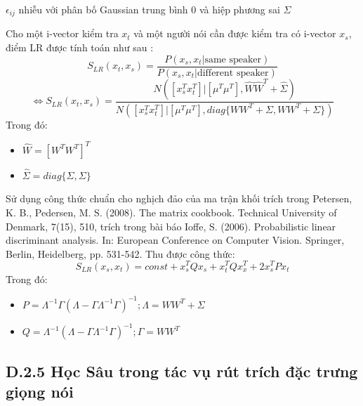 \documentclass{article}
\begin{document}
	$\epsilon_{ij}$ nhiễu với phân bố Gaussian trung bình 0 và hiệp phương sai $\Sigma$
	
	Cho một i-vector kiểm tra $x_t$ và một người nói cần được kiểm tra có i-vector $x_s$, điểm LR được tính toán như sau :
	$$S_{LR}(x_t, x_s) = \frac{P(x_s, x_t|\text{same speaker})}{P(x_s, x_t|\text{different speaker})}$$
	$$\Leftrightarrow S_{LR}(x_t, x_s) = 
	\frac{N([x_s^Tx_t^T]|[\mu^T\mu^T], \hat{W}\hat{W}^T + \hat{\Sigma})}{N([x_s^Tx_t^T]|[\mu^T\mu^T],diag\{WW^T+\Sigma, WW^T+\Sigma\})}$$
	Trong đó:
	\begin{itemize}
		\item $\hat{W} = [W^TW^T]^T$
		\item $\hat{\Sigma}=diag\{\Sigma,\Sigma\}$
	\end{itemize}
	Sử dụng công thức chuẩn cho nghịch đảo của ma trận khối trích trong Petersen, K. B., Pedersen, M. S. (2008). The matrix cookbook.
	Technical University of Denmark, 7(15), 510, trích trong bài báo Ioffe, S. (2006). Probabilistic linear discriminant analysis. In:
	European Conference on Computer Vision. Springer, Berlin,
	Heidelberg, pp. 531-542. Thu được công thức: 
	$$S_{LR}(x_s, x_t) = const + x_s^TQx_s + x_t^TQx_x^T + 2x_s^TPx_t$$
	Trong đó: 
	\begin{itemize}
		\item $P = \Lambda ^{-1}\Gamma(\Lambda - \Gamma\Lambda^{-1}\Gamma)^{-1};\Lambda=WW^T+\Sigma$
		\item $Q = \Lambda ^{-1}(\Lambda - \Gamma\Lambda^{-1}\Gamma)^{-1};\Gamma=WW^T$
	\end{itemize}
	
	
	\subsection{D.2.5 Học Sâu trong tác vụ rút trích đặc trưng giọng nói}
\end{document}
